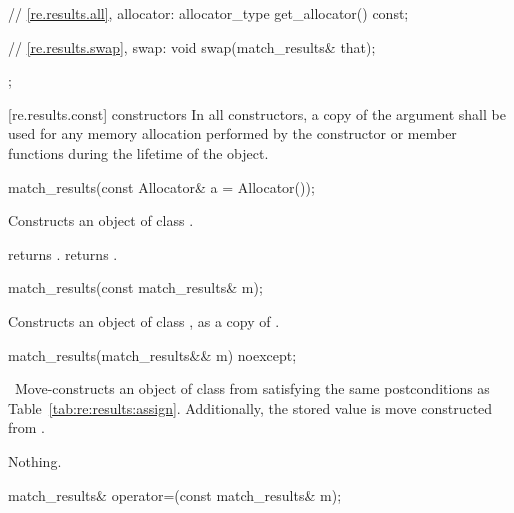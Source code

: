 \begin{codeblock}
{{     // \ref{re.results.all}, allocator:
     allocator_type get_allocator() const;

     // \ref{re.results.swap}, swap:
     void swap(match_results& that);
  }; 
}
\end{codeblock}

[re.results.const]{ constructors}
\pnum
In all  constructors, a copy of the  argument
shall be used for any memory allocation performed by the constructor
or member functions during the lifetime of the object.

%
\begin{itemdecl}
match_results(const Allocator& a = Allocator()); 
\end{itemdecl}

\begin{itemdescr}
\pnum
\effects  Constructs an object of class . 

\pnum
\postconditions
{} returns .
 returns .
\end{itemdescr}

%
\begin{itemdecl}
match_results(const match_results& m); 
\end{itemdecl}

\begin{itemdescr}
\pnum
\effects  Constructs an object of class , as a
copy of .
\end{itemdescr}

%
\begin{itemdecl}
match_results(match_results&& m) noexcept;
\end{itemdecl}

\begin{itemdescr}
\pnum
\effects\ Move-constructs an object of class  from 
satisfying the same postconditions as Table~\ref{tab:re:results:assign}. Additionally,
the stored  value is move constructed from .

\pnum
\throws Nothing.
\end{itemdescr}

%
%
\begin{itemdecl}
match_results& operator=(const match_results& m); 
\end{itemdecl}

